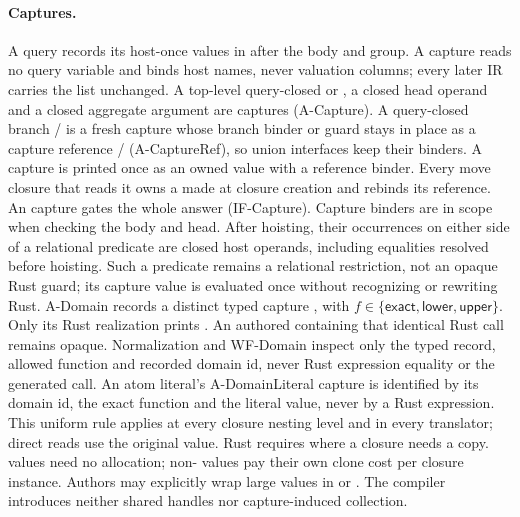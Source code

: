 \paragraph{Captures.}
A query records its host-once values in
 after the body and group. A capture
reads no query variable and binds host names, never valuation columns; every
later IR carries the list unchanged. A top-level query-closed  or
, a closed head operand and a closed aggregate argument are captures
(A-Capture). A query-closed branch / is a fresh capture
whose branch binder or guard stays in place as a capture reference
 /  (A-CaptureRef), so union
interfaces keep their binders. A  capture is printed once as an owned
value with a reference binder. Every move closure that reads it owns a
 made at closure creation and rebinds its reference.
An  capture gates the whole answer (IF-Capture).
Capture binders are in scope when checking the body and head. After hoisting,
their occurrences on either side of a relational  predicate are
closed host operands, including equalities resolved before hoisting. Such a
predicate remains a relational restriction, not an opaque Rust guard; its
capture value is evaluated once without recognizing or rewriting Rust.
A-Domain records a distinct typed capture
, with $f\in\{\mathsf{exact},\mathsf{lower},\mathsf{upper}\}$.
Only its Rust realization prints .
An authored  containing that identical Rust call remains opaque.
Normalization and WF-Domain inspect only the typed record, allowed function
and recorded domain id, never Rust expression equality or the generated call.
An atom literal's A-DomainLiteral capture is identified by its domain id, the
\textsf{exact} function and the literal value, never by a Rust expression.
This uniform rule applies at every closure nesting level and in every
translator; direct reads use the original value. Rust requires 
where a closure needs a copy.  values need no allocation;
non- values pay their own clone cost per closure instance.
Authors may explicitly wrap large values in  or .
The compiler introduces neither shared handles nor capture-induced collection.

